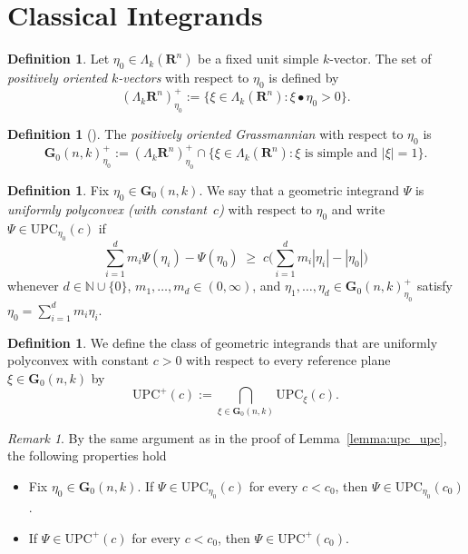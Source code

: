 \documentclass[a4paper,twoside,reqno]{article}
\theoremstyle{definition}
\theoremstyle{remark}
\theoremstyle{plain}
\theoremstyle{remark}
\newtheorem{remark}[theorem]{Remark}
\theoremstyle{definition}
\newtheorem{definition}[theorem]{Definition}
\newcommand{\ograss}[2]{\mathbf{G}_0(#1,#2)}
\newcommand{\natp}{\mathbb{N}}
\newcommand{\nat}{\natp \cup \{0\}}
\newcommand{\UPC}{\mathrm{UPC}}
\newcommand{\R}{\mathbf{R}}
\begin{document}
\section{Classical Integrands}\label{section:class_integrands}

\begin{definition}
    Let $\eta_0 \in \Lambda_k(\R^n)$ be a fixed unit simple $k$-vector.
    The set of \emph{positively oriented $k$-vectors} with respect to $\eta_0$ 
    is defined by
    \[
        (\Lambda_k \R^n)^+_{\eta_0} :=
        \bigl\{
            \xi \in \Lambda_k(\R^n) : \xi \bullet \eta_0 > 0
        \bigr\}.
    \]
\end{definition}

\begin{definition}[]
    The \emph{positively oriented Grassmannian} with respect to $\eta_0$ is
    \[
        \ograss{n}{k}^{+}_{\eta_0} :=
        (\Lambda_k \R^n)^+_{\eta_0} 
        \cap 
        \bigl\{
            \xi \in \Lambda_k(\R^n) : \xi \text{ is simple and } |\xi| = 1
        \bigr\}.
    \]
\end{definition}

\begin{definition}
    Fix $\eta_0 \in \ograss nk$. We say that a geometric integrand $\Psi$ is
    \emph{uniformly polyconvex (with constant~$c$)} with respect to $\eta_0$ 
    and write $\Psi \in \UPC_{\eta_0}(c)$ if
    \[
        \sum_{i=1}^{d} m_i \Psi(\eta_i) - \Psi(\eta_0)
        \;\ge\;
        c \bigl( \sum_{i=1}^{d} m_i |\eta_i| - |\eta_0| \bigr)
    \]
    whenever $d \in \nat$, $m_1,\ldots,m_d \in (0,\infty)$, and
    $\eta_1,\ldots,\eta_d \in \ograss{n}{k}^{+}_{\eta_0}$ satisfy
    $\eta_0 = \sum_{i=1}^{d} m_i \eta_i$.
\end{definition}

\begin{definition}
    We define the class of geometric integrands that are uniformly polyconvex
    with constant $c > 0$ with respect to every reference plane
    $\xi \in \ograss{n}{k}$ by
    \[
        \UPC^{+}(c)
        :=
        \bigcap_{\xi \in \ograss{n}{k}} \UPC_{\xi}(c).
    \]
\end{definition}

\begin{remark}\label{lemma:plane_wise_upc}
    By the same argument as in the proof of Lemma~\ref{lemma:upc_upc}, the
    following properties hold
    \begin{itemize}
        \item[(i)] Fix $\eta_0 \in \ograss{n}{k}$.  
        If $\Psi \in \UPC_{\eta_0}(c)$ for every $c < c_0$, then
        $\Psi \in \UPC_{\eta_0}(c_0)$.
        \item[(ii)] If $\Psi \in \UPC^{+}(c)$ for every $c < c_0$, then
        $\Psi \in \UPC^{+}(c_0)$.
    \end{itemize}
\end{remark}
\end{document}
